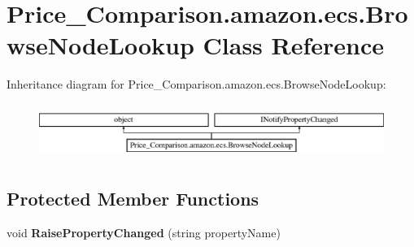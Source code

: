 \hypertarget{class_price___comparison_1_1amazon_1_1ecs_1_1_browse_node_lookup}{\section{Price\-\_\-\-Comparison.\-amazon.\-ecs.\-Browse\-Node\-Lookup Class Reference}
\label{class_price___comparison_1_1amazon_1_1ecs_1_1_browse_node_lookup}
}


 


Inheritance diagram for Price\-\_\-\-Comparison.\-amazon.\-ecs.\-Browse\-Node\-Lookup\-:\begin{figure}[H]
\begin{center}
\leavevmode
\includegraphics[height=1.794872cm]{class_price___comparison_1_1amazon_1_1ecs_1_1_browse_node_lookup}
\end{center}
\end{figure}
\subsection*{Protected Member Functions}
\begin{DoxyCompactItemize}
\item 
\hypertarget{class_price___comparison_1_1amazon_1_1ecs_1_1_browse_node_lookup_a9e36a3a05843fe58b6221a21d31ed9a5}{void {\bfseries Raise\-Property\-Changed} (string property\-Name)}\label{class_price___comparison_1_1amazon_1_1ecs_1_1_browse_node_lookup_a9e36a3a05843fe58b6221a21d31ed9a5}

\end{DoxyCompactItemize}
